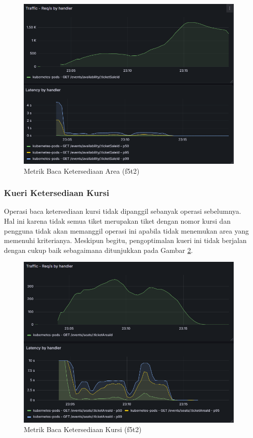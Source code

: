 \begin{figure}[htbp]
    \centering
    \includegraphics[width=1\textwidth]{resources/chapter-4/latency-area-availability.png}
    \caption{Metrik Baca Ketersediaan Area (f5t2)}
    \label{fig:latency-get-area}
\end{figure}

\subsubsection{Kueri Ketersediaan Kursi}

Operasi baca ketersediaan kursi tidak dipanggil sebanyak operasi sebelumnya. Hal ini karena tidak semua tiket merupakan tiket dengan nomor kursi dan pengguna tidak akan memanggil operasi ini apabila tidak menemukan area yang memenuhi kriterianya. Meskipun begitu, pengoptimalan kueri ini tidak berjalan dengan cukup baik sebagaimana ditunjukkan pada Gambar \ref{fig:latency-get-seat}.

\pagebreak

\begin{figure}[htbp]
    \centering
    \includegraphics[width=1\textwidth]{resources/chapter-4/latency-seat-availability.png}
    \caption{Metrik Baca Ketersediaan Kursi (f5t2)}
    \label{fig:latency-get-seat}
\end{figure}

